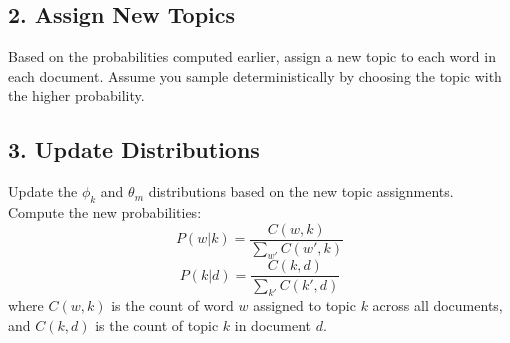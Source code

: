 \documentclass{article}
\begin{document}
\subsection*{2. Assign New Topics}
Based on the probabilities computed earlier, assign a new topic to each word in each document. Assume you sample deterministically by choosing the topic with the higher probability.

\subsection*{3. Update Distributions}
Update the $\phi_k$ and $\theta_m$ distributions based on the new topic assignments. Compute the new probabilities:
\[
P(w|k) = \frac{C(w, k)}{\sum_{w'} C(w', k)}
\]
\[
P(k|d) = \frac{C(k, d)}{\sum_{k'} C(k', d)}
\]
where $C(w, k)$ is the count of word $w$ assigned to topic $k$ across all documents, and $C(k, d)$ is the count of topic $k$ in document $d$.
\end{document}
